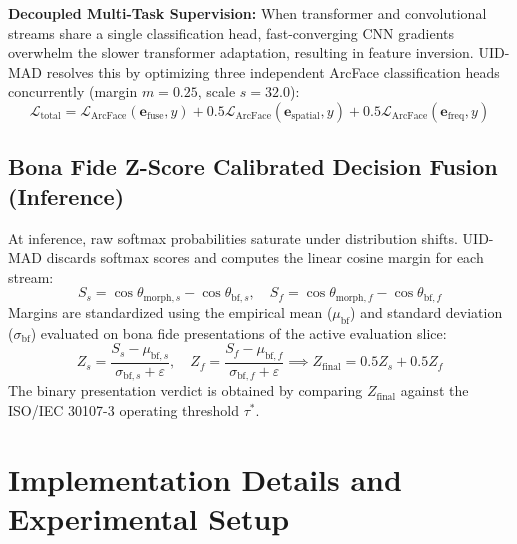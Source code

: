 \documentclass[11pt,a4paper]{article}
\begin{document}
\textbf{Decoupled Multi-Task Supervision:} When transformer and convolutional streams share a single classification head, fast-converging CNN gradients overwhelm the slower transformer adaptation, resulting in feature inversion. UID-MAD resolves this by optimizing three independent ArcFace \cite{deng2019arcface} classification heads concurrently (margin $m=0.25$, scale $s=32.0$):
\begin{equation}
    \mathcal{L}_{\text{total}} = \mathcal{L}_{\text{ArcFace}}(\mathbf{e}_{\text{fuse}}, y) + 0.5 \mathcal{L}_{\text{ArcFace}}(\mathbf{e}_{\text{spatial}}, y) + 0.5 \mathcal{L}_{\text{ArcFace}}(\mathbf{e}_{\text{freq}}, y)
    \label{eq:joint_loss}
\end{equation}

\subsection{Bona Fide Z-Score Calibrated Decision Fusion (Inference)}
At inference, raw softmax probabilities saturate under distribution shifts. UID-MAD discards softmax scores and computes the linear cosine margin for each stream:
\begin{equation}
    S_s = \cos \theta_{\text{morph}, s} - \cos \theta_{\text{bf}, s}, \quad S_f = \cos \theta_{\text{morph}, f} - \cos \theta_{\text{bf}, f}
\end{equation}
Margins are standardized using the empirical mean ($\mu_{\text{bf}}$) and standard deviation ($\sigma_{\text{bf}}$) evaluated on bona fide presentations of the active evaluation slice:
\begin{equation}
    Z_s = \frac{S_s - \mu_{\text{bf}, s}}{\sigma_{\text{bf}, s} + \varepsilon}, \quad Z_f = \frac{S_f - \mu_{\text{bf}, f}}{\sigma_{\text{bf}, f} + \varepsilon} \implies Z_{\text{final}} = 0.5 Z_s + 0.5 Z_f
\end{equation}
The binary presentation verdict is obtained by comparing $Z_{\text{final}}$ against the ISO/IEC 30107-3 \cite{iso30107_3} operating threshold $\tau^*$.

\section{Implementation Details and Experimental Setup}
\label{sec:setup}
\end{document}
